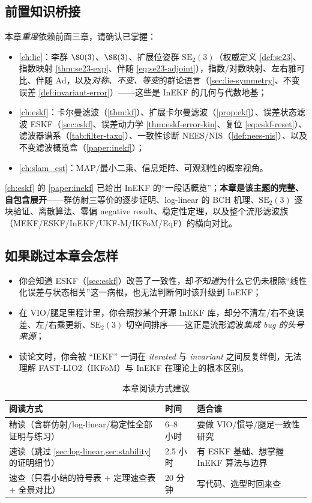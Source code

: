 \subsection*{前置知识桥接}
本章\emph{重度}依赖前面三章，请确认已掌握：
\begin{itemize}
  \item \cref{ch:lie}：李群 $\SO(3)$、$\SE(3)$、扩展位姿群 $\mathrm{SE}_2(3)$（权威定义 \cref{def:se23}、指数映射 \cref{thm:se23-exp}、伴随 \cref{eq:se23-adjoint}），指数/对数映射、左右雅可比、伴随 $\mathrm{Ad}$，以及\emph{对称、不变、等变}的群论语言（\cref{sec:lie-symmetry}、不变误差 \cref{def:invariant-error}）——这些是 InEKF 的几何与代数地基；
  \item \cref{ch:eskf}：卡尔曼滤波（\cref{thm:kf}）、扩展卡尔曼滤波（\cref{prop:ekf}）、误差状态滤波 ESKF（\cref{sec:eskf}、误差动力学 \cref{thm:eskf-error-kin}、复位 \cref{eq:eskf-reset}）、滤波器谱系（\cref{tab:filter-taxo}）、一致性诊断 NEES/NIS（\cref{def:nees-nis}）、以及不变滤波概览盒（\cref{paper:inekf}）；
  \item \cref{ch:slam_est}：MAP/最小二乘、信息矩阵、可观测性的概率视角。
\end{itemize}
\cref{ch:eskf} 的 \cref{paper:inekf} 已给出 InEKF 的“一段话概览”；\textbf{本章是该主题的完整、自包含展开}——群仿射三等价的逐步证明、log-linear 的 BCH 机理、$\mathrm{SE}_2(3)$ 逐块验证、离散算法、零偏 negative result、稳定性定理，以及整个流形滤波族（MEKF/ESKF/InEKF/UKF-M/IKFoM/EqF）的横向对比。

\subsection*{如果跳过本章会怎样}
\begin{itemize}
  \item 你会知道 ESKF（\cref{sec:eskf}）改善了一致性，却\emph{不知道}为什么它仍未根除“线性化误差与状态相关”这一病根，也无法判断何时该升级到 InEKF；
  \item 在 VIO/腿足里程计里，你会照抄某个开源 InEKF 库，却分不清左/右不变误差、左/右乘更新、$\mathrm{SE}_2(3)$ 切空间排序——这正是流形滤波\emph{集成 bug 的头号来源}；
  \item 读论文时，你会被 “IEKF” 一词在 \emph{iterated} 与 \emph{invariant} 之间反复绊倒，无法理解 FAST-LIO2（IKFoM）与 InEKF 在理论上的根本区别。
\end{itemize}

\begin{table}[H]\centering\small
\caption{本章阅读方式建议}
\begin{tabular}{lll}
\toprule
阅读方式 & 时间 & 适合谁 \\
\midrule
精读（含群仿射/log-linear/稳定性全部证明与练习） & 6--8 小时 & 要做 VIO/惯导/腿足一致性研究 \\
速读（跳过 \cref{sec:log-linear,sec:stability} 的证明细节） & 2.5 小时 & 有 ESKF 基础、想掌握 InEKF 算法与边界 \\
速查（只看小结的符号表 $+$ 定理速查表 $+$ 全景对比） & 20 分钟 & 写代码、选型时回来查 \\
\bottomrule
\end{tabular}
\end{table}

